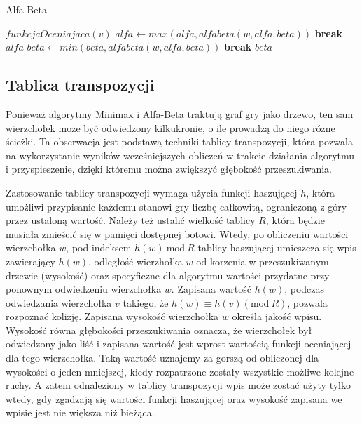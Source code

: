 \documentclass{pracamgr}
\begin{document}
\begin{algorithm}
\caption{Alfa-Beta}\label{alfabeta}
\begin{algorithmic}[1]
	\State \Return $funkcjaOceniajaca(v)$
\EndIf
        \State $alfa \gets max(alfa, alfabeta(w, alfa, beta))$
            \State \textbf{break}
        \EndIf
    \EndFor
	\State \Return $alfa$
\Else
        \State $beta \gets min(beta, alfabeta(w, alfa, beta))$
            \State \textbf{break}
        \EndIf
    \EndFor
	\State \Return $beta$
\EndIf
\EndFunction
\end{algorithmic}
\end{algorithm}

\subsection{Tablica transpozycji}

Ponieważ algorytmy Minimax i Alfa-Beta traktują graf gry jako drzewo, ten sam wierzchołek może być odwiedzony kilkukronie, o ile prowadzą do niego różne ścieżki.
Ta obserwacja jest podstawą techniki tablicy transpozycji, która pozwala na wykorzystanie wyników wcześniejszych obliczeń w trakcie działania algorytmu i przyspieszenie, dzięki któremu można zwiększyć głębokość przeszukiwania.

Zastosowanie tablicy transpozycji wymaga użycia funkcji haszującej \(h\), która umożliwi przypisanie każdemu stanowi gry liczbę całkowitą, ograniczoną z góry przez ustaloną wartość.
Należy też ustalić wielkość tablicy \(R\), która będzie musiała zmieścić się w pamięci dostępnej botowi.
Wtedy, po obliczeniu wartości wierzchołka \(w\), pod indeksem \(h(w)\ \textrm{mod}\ R\) tablicy haszującej umieszcza się wpis zawierający \(h(w)\), odległość wierzhołka \(w\) od korzenia w przeszukiwanym drzewie (wysokość) oraz specyficzne dla algorytmu wartości przydatne przy ponownym odwiedzeniu wierzchołka \(w\).
Zapisana wartość \(h(w)\), podczas odwiedzania wierzchołka \(v\) takiego, że \(h(w) \equiv h(v) (\textrm{mod}\ R)\), pozwala rozpoznać kolizję.
Zapisana wysokość wierzchołka \(w\) określa jakość wpisu.
Wysokość równa głębokości przeszukiwania oznacza, że wierzchołek był odwiedzony jako liść i zapisana wartość jest wprost wartością funkcji oceniającej dla tego wierzchołka.
Taką wartość uznajemy za gorszą od obliczonej dla wysokości o jeden mniejszej, kiedy rozpatrzone zostały wszystkie możliwe kolejne ruchy.
A zatem odnaleziony w tablicy transpozycji wpis może zostać użyty tylko wtedy, gdy zgadzają się wartości funkcji haszującej oraz wysokość zapisana we wpisie jest nie większa niż bieżąca.
\end{document}
